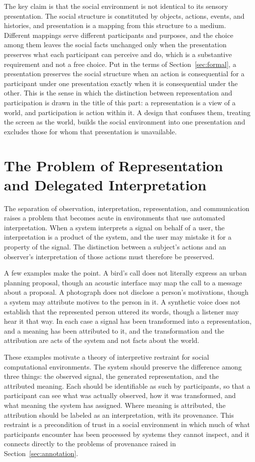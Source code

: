 \documentclass[11pt]{article}
\theoremstyle{remark}
\begin{document}
The key claim is that the social environment is not identical to its sensory presentation. The social structure is constituted by objects, actions, events, and histories, and presentation is a mapping from this structure to a medium. Different mappings serve different participants and purposes, and the choice among them leaves the social facts unchanged only when the presentation preserves what each participant can perceive and do, which is a substantive requirement and not a free choice. Put in the terms of Section~\ref{sec:formal}, a presentation preserves the social structure when an action is consequential for a participant under one presentation exactly when it is consequential under the other. This is the sense in which the distinction between representation and participation is drawn in the title of this part: a representation is a view of a world, and participation is action within it. A design that confuses them, treating the screen as the world, builds the social environment into one presentation and excludes those for whom that presentation is unavailable.

\section{The Problem of Representation and Delegated Interpretation}

The separation of observation, interpretation, representation, and communication raises a problem that becomes acute in environments that use automated interpretation. When a system interprets a signal on behalf of a user, the interpretation is a product of the system, and the user may mistake it for a property of the signal. The distinction between a subject's actions and an observer's interpretation of those actions must therefore be preserved.

A few examples make the point. A bird's call does not literally express an urban planning proposal, though an acoustic interface may map the call to a message about a proposal. A photograph does not disclose a person's motivations, though a system may attribute motives to the person in it. A synthetic voice does not establish that the represented person uttered its words, though a listener may hear it that way. In each case a signal has been transformed into a representation, and a meaning has been attributed to it, and the transformation and the attribution are acts of the system and not facts about the world.

These examples motivate a theory of interpretive restraint for social computational environments. The system should preserve the difference among three things: the observed signal, the generated representation, and the attributed meaning. Each should be identifiable as such by participants, so that a participant can see what was actually observed, how it was transformed, and what meaning the system has assigned. Where meaning is attributed, the attribution should be labeled as an interpretation, with its provenance. This restraint is a precondition of trust in a social environment in which much of what participants encounter has been processed by systems they cannot inspect, and it connects directly to the problems of provenance raised in Section~\ref{sec:annotation}.
\end{document}
